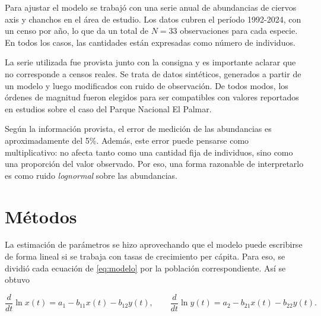 \documentclass[11pt,a4paper]{article}
\newif\ifguias
\newcommand{\guia}[1]{\ifguias\par\noindent
  {\color{gray!85!black}\small\itshape #1}\par\medskip\fi}
\begin{document}
Para ajustar el modelo se trabajó con una serie anual de abundancias de ciervos axis y chanchos en el área de estudio. Los datos cubren el período 1992-2024, con un censo por año, lo que da un total de $N=33$ observaciones para cada especie. En todos los casos, las cantidades están expresadas como número de individuos.

La serie utilizada fue provista junto con la consigna y es importante aclarar que no corresponde a censos reales. Se trata de datos sintéticos, generados a partir de un modelo y luego modificados con ruido de observación. De todos modos, los órdenes de magnitud fueron elegidos para ser compatibles con valores reportados en estudios sobre el caso del Parque Nacional El Palmar.

Según la información provista, el error de medición de las abundancias es aproximadamente del 5\%. Además, este error puede pensarse como multiplicativo: no afecta tanto como una cantidad fija de individuos, sino como una proporción del valor observado. Por eso, una forma razonable de interpretarlo es como ruido \textit{lognormal} sobre las abundancias.

\section{Métodos}
\label{sec:metodos}


La estimación de parámetros se hizo aprovechando que el modelo puede escribirse de forma lineal si se trabaja con tasas de crecimiento per cápita. Para eso, se dividió cada ecuación de \eqref{eq:modelo} por la población correspondiente. Así se obtuvo

\begin{equation}
\label{eq:log-derivadas}
\frac{d}{dt}\ln x(t) = a_1 - b_{11}x(t) - b_{12}y(t), \qquad
\frac{d}{dt}\ln y(t) = a_2 - b_{21}x(t) - b_{22}y(t).
\end{equation}
\end{document}
